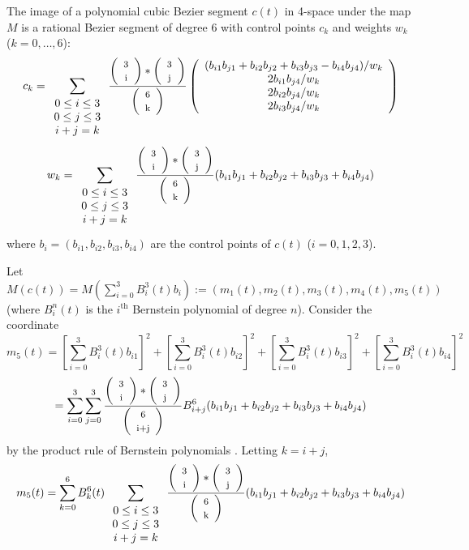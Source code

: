\begin{lemma}
\label{sextic}
The image of a polynomial cubic Bezier segment $c(t)$ in 4-space 
under the map $M$
is a rational Bezier segment of degree 6 with control points $c_k$
and weights $w_k$ ($k = 0, \ldots, 6$):
\begin{equation}
\label{eq:control-pts}
c_k = \sum_{\begin{array}{c} 0 \leq i \leq 3 \\ 
			     0 \leq j \leq 3 \\ 
			     i+j=k
			     \end{array}} 
        \frac{\choice{3}{i} * \choice{3}{j}}{\choice{6}{k}}
	\left( \begin{array}{c}
            (b_{i1} b_{j1} + b_{i2} b_{j2} + b_{i3} b_{j3} - b_{i4} b_{j4}) / w_k \\
            2b_{i1} b_{j4} / w_k \\
            2b_{i2} b_{j4} / w_k \\
            2b_{i3} b_{j4} / w_k
	\end{array} \right)
\end{equation}
\begin{equation}
w_k = \sum_{\begin{array}{c} 0 \leq i \leq 3 \\ 
			     0 \leq j \leq 3 \\ 
			     i+j=k
			     \end{array}}
        \frac{\left( \begin{array}{c} \mbox{\footnotesize{3}} \\ \mbox{\footnotesize{i}} \end{array} \right) * \left( \begin{array}{c} \mbox{\footnotesize{3}} \\ \mbox{\footnotesize{j}} \end{array} \right)}{\left( \begin{array}{c} \mbox{\footnotesize{6}} \\ \mbox{\footnotesize{k}} \end{array} \right)}
	(b_{i1} b_{j1} + b_{i2} b_{j2} + b_{i3} b_{j3} + b_{i4} b_{j4})
\end{equation}
where $b_i = (b_{i1},b_{i2},b_{i3},b_{i4})$ are the control points of $c(t)$
($i=0,1,2,3$).
\end{lemma}
\prf
Let $M(c(t)) = M(\sum_{i=0}^3 B_i^3(t) b_{i}) 
:= (m_1(t),m_2(t),m_3(t),m_4(t),m_5(t))$ 
(where $B_i^n(t)$ is the $i^{\mbox{th}}$ Bernstein polynomial of degree
$n$).
Consider the coordinate 
\[ m_5(t) =  [\sum_{i=0}^3 B_i^3(t) b_{i1}]^2 + 
	[\sum_{i=0}^3 B_i^3(t) b_{i2}]^2 +
	[\sum_{i=0}^3 B_i^3(t) b_{i3}]^2 +
	[\sum_{i=0}^3 B_i^3(t) b_{i4}]^2
\]
\[     =   \sum_{i=0}^3 \sum_{j=0}^3 
	\frac{\left( \begin{array}{c} \mbox{\footnotesize{3}} \\ \mbox{\footnotesize{i}} \end{array} \right) * \left( \begin{array}{c} \mbox{\footnotesize{3}} \\ \mbox{\footnotesize{j}} \end{array} \right)}{\left( \begin{array}{c} \mbox{\footnotesize{6}} \\ \mbox{\footnotesize{i+j}} \end{array} \right)}
       B^6_{i+j} (b_{i1} b_{j1} + b_{i2} b_{j2} + b_{i3} b_{j3} + b_{i4} b_{j4})
\]
by the product rule of Bernstein polynomials \cite{farin93}.
Letting $k=i+j$, 
\[ m_5(t) =   \sum_{k=0}^6 B_k^6(t) 
	\sum_{\begin{array}{c} 0 \leq i \leq 3 \\ 
			     0 \leq j \leq 3 \\ 
			     i+j=k
			     \end{array}} 
        \frac{\left( \begin{array}{c} \mbox{\footnotesize{3}} \\ \mbox{\footnotesize{i}} \end{array} \right) * \left( \begin{array}{c} \mbox{\footnotesize{3}} \\ \mbox{\footnotesize{j}} \end{array} \right)}{\left( \begin{array}{c} \mbox{\footnotesize{6}} \\ \mbox{\footnotesize{k}} \end{array} \right)} 
	(b_{i1} b_{j1} + b_{i2} b_{j2} + b_{i3} b_{j3} + b_{i4} b_{j4}) \]
